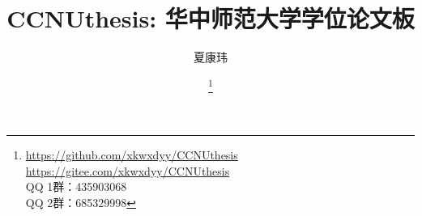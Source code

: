 \usepackage{multirow, xeCJKfntef, xpinyin}
\usepackage{graphicx}
\usepackage{tabularray}
\usepackage[
  backend = biber,
  style = gb7714-2015
]{biblatex}

\graphicspath{{figures}}

\def\FSID{“{\xeCJKsetup{PunctStyle=banjiao}。}”} %
\def\FSFW{“{\xeCJKsetup{PunctStyle=banjiao}．}”} %
\def\COFW{“{\xeCJKsetup{PunctStyle=banjiao}：}”} %
\def\SCFW{“{\xeCJKsetup{PunctStyle=banjiao}；}”} %


\title{\textcolor{MaterialIndigo800}{%
  \textbf{CCNUthesis: 华中师范大学学位论文板}}}
\author{夏康玮}
\date{\DocDate \quad \DocVersion%
  \thanks{%
    \parbox{0.5\textwidth}{
      \url{https://github.com/xkwxdyy/CCNUthesis} \\
      \url{https://gitee.com/xkwxdyy/CCNUthesis}\\
      QQ 1群：435903068\\
      QQ 2群：685329998
    }
  }
}